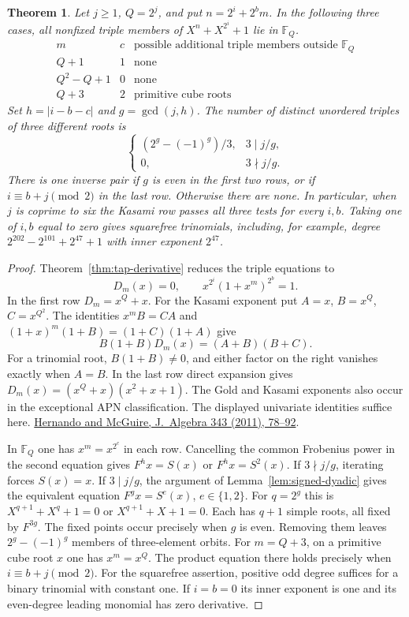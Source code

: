 \documentclass[11pt]{article}
\newtheorem{theorem}{Theorem}
\begin{document}
\begin{theorem}\label{thm:kasami-tap}
Let \(j\ge1\), \(Q=2^j\), and put \(n=2^i+2^b m\).
In the following three cases, all nonfixed triple members of
\(X^n+X^{2^i}+1\) lie in \(\mathbb F_Q\).
\[
\begin{array}{c|c|c}
 m & c & \text{possible additional triple members outside }\mathbb F_Q\\ \hline
 Q+1       & 1 & \text{none}\\
 Q^2-Q+1   & 0 & \text{none}\\
 Q+3       & 2 & \text{primitive cube roots}
\end{array}
\]
Set \(h=|i-b-c|\) and \(g=\gcd(j,h)\). The number of distinct
unordered triples of three different roots is
\[
  \begin{cases}(2^g-(-1)^g)/3,&3\mid j/g,\\0,&3\nmid j/g.\end{cases}
\]
There is one inverse pair if \(g\) is even in the first two rows,
or if \(i\equiv b+j\pmod2\) in the last row. Otherwise there are none.
In particular, when \(j\) is coprime to six the Kasami row passes
all three tests for every \(i,b\). Taking one of \(i,b\) equal to zero
gives squarefree trinomials, including, for example, degree
\(2^{202}-2^{101}+2^{47}+1\) with inner exponent \(2^{47}\).
\end{theorem}
\begin{proof}
Theorem~\ref{thm:tap-derivative} reduces the triple equations to
\[
             D_m(x)=0,\qquad x^{2^i}(1+x^m)^{2^b}=1 .
\]
In the first row \(D_m=x^Q+x\). For the Kasami exponent put
\(A=x\), \(B=x^Q\), \(C=x^{Q^2}\). The identities \(x^m B=CA\)
and \((1+x)^m(1+B)=(1+C)(1+A)\) give
\[
             B(1+B)D_m(x)=(A+B)(B+C).
\]
For a trinomial root, \(B(1+B)\ne0\), and either factor on the right
vanishes exactly when \(A=B\). In the last row direct expansion gives
\(D_m(x)=(x^Q+x)(x^2+x+1)\).
The Gold and Kasami exponents also occur in the exceptional APN
classification. The displayed univariate identities suffice here.
\href{https://www.sciencedirect.com/science/article/pii/S0021869311003656}{Hernando and McGuire, J.~Algebra 343 (2011), 78--92}.

In \(\mathbb F_Q\) one has \(x^m=x^{2^c}\) in each row. Cancelling
the common Frobenius power in the second equation gives
\(F^h x=S(x)\) or \(F^h x=S^2(x)\). If \(3\nmid j/g\), iterating
forces \(S(x)=x\). If \(3\mid j/g\), the argument of
Lemma~\ref{lem:signed-dyadic} gives the equivalent equation
\(F^g x=S^e(x)\), \(e\in\{1,2\}\). For \(q=2^g\) this is
\(X^{q+1}+X^q+1=0\) or \(X^{q+1}+X+1=0\). Each has \(q+1\)
simple roots, all fixed by \(F^{3g}\). The fixed points occur
precisely when \(g\) is even. Removing them leaves
\(2^g-(-1)^g\) members of three-element orbits. For \(m=Q+3\),
on a primitive cube root \(x\) one has \(x^m=x^Q\). The product
equation there holds precisely when \(i\equiv b+j\pmod2\).
For the squarefree assertion, positive odd degree suffices for a
binary trinomial with constant one. If \(i=b=0\) its inner exponent
is one and its even-degree leading monomial has zero derivative.
\end{proof}
\end{document}
